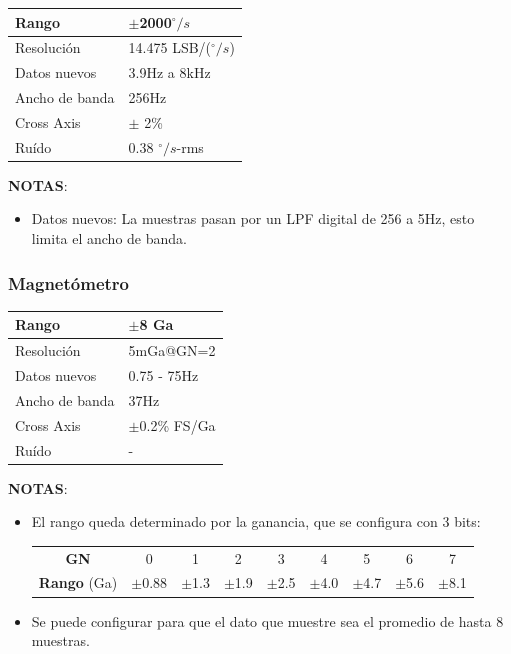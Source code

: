\documentclass[main]{subfiles}
\begin{document}
\begin{table}[H]
\begin{center}
\begin{tabular}{|p{3cm}|p{6.5cm}|}
\hline
Rango & $\pm$2000$^\circ/s$ \\
\hline
Resoluci\'on & 14.475 LSB/($^\circ/s$) \\
\hline
Datos nuevos &  3.9Hz a 8kHz\\
\hline
Ancho de banda & 256Hz \\
\hline
Cross Axis & $\pm$ 2\% \\
\hline
Ru\'ido & 0.38 $^\circ/s$-rms \\
\hline
\end{tabular}
\label{tab:gyro}
\end{center}
\end{table}

\textbf{NOTAS}:
\begin{itemize}
\item Datos nuevos: La muestras pasan por un LPF digital de 256 a 5Hz, esto limita el ancho de banda.
\end{itemize}

\subsubsection{Magnet\'ometro}

\begin{table}[H]
\begin{center}
\begin{tabular}{|p{3cm}|p{6.5cm}|}
\hline
Rango & $\pm$8 Ga\\
\hline
Resoluci\'on &  5mGa@GN=2\\
\hline
Datos nuevos &  0.75 - 75Hz\\
\hline
Ancho de banda &  37Hz\\
\hline
Cross Axis & $\pm$0.2\% FS/Ga \\
\hline
Ru\'ido & - \\
\hline
\end{tabular}
\label{tab:magn}
\end{center}
\end{table}

\newpage
\textbf{NOTAS}:
\begin{itemize}
\item El rango queda determinado por la ganancia, que se configura con 3 bits:
\begin{table}[H]
\begin{center}
\begin{tabular}{|c|c|c|c|c|c|c|c|c|}
\hline
\textbf{GN} & 0 & 1 & 2 & 3 & 4 & 5 & 6 & 7 \\
\textbf{Rango} (Ga)& $\pm$0.88 & $\pm$1.3 & $\pm$1.9 & $\pm$2.5 & $\pm$4.0 & $\pm$4.7 & $\pm$5.6 & $\pm$8.1 \\
\hline
\end{tabular}
\label{tab:magn-gain}
\end{center}
\end{table}
\item Se puede configurar para que el dato que muestre sea el promedio de hasta 8 muestras.
\end{itemize}
\end{document}
